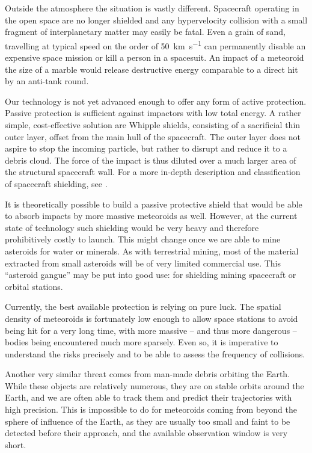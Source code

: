     Outside the atmosphere the situation is vastly different.
    Spacecraft operating in the open space are no longer shielded
    and any hypervelocity collision with a small fragment of interplanetary matter may easily be fatal.
    Even a grain of sand, travelling at typical speed on the order of \SI{50}{\kilo\metre\per\second} can permanently disable
    an expensive space mission or kill a person in a spacesuit.
    An impact of a meteoroid the size of a marble would release
    destructive energy comparable to a direct hit by an anti-tank round.

    Our technology is not yet advanced enough to offer any form of active protection.
    Passive protection is sufficient against impactors with low total energy.
    A rather simple, cost-effective solution are Whipple shields, consisting of a sacrificial thin outer layer,
    offset from the main hull of the spacecraft.
    The outer layer does not aspire to stop the incoming particle,
    but rather to disrupt and reduce it to a debris cloud.
    The force of the impact is thus diluted over a much larger area of the structural spacecraft wall.
    For a more in-depth description and classification of spacecraft shielding, see \citet{nasa-shield}.

    It is theoretically possible to build a passive protective shield that would be able to absorb impacts
    by more massive meteoroids as well.
    However, at the current state of technology such shielding would be very heavy and therefore prohibitively costly to launch.
    This might change once we are able to mine asteroids for water or minerals.
    As with terrestrial mining, most of the material extracted from small asteroids will be of very limited commercial use.
    This ``asteroid gangue'' may be put into good use: for shielding mining spacecraft or orbital stations.

    Currently, the best available protection is relying on pure luck. The spatial density of meteoroids is
    fortunately low enough to allow space stations to avoid being hit for a very long time,
    with more massive -- and thus more dangerous -- bodies being encountered much more sparsely.
    Even so, it is imperative to understand the risks precisely and to be able to assess the frequency of collisions.

    Another very similar threat comes from man-made debris orbiting the Earth.
    While these objects are relatively numerous, they are on stable orbits around
    the Earth, and we are often able to track them and predict their trajectories with high precision.
    This is impossible to do for meteoroids coming from beyond the sphere of influence of the Earth,
    as they are usually too small and faint to be detected before their approach,
    and the available observation window is very short.

